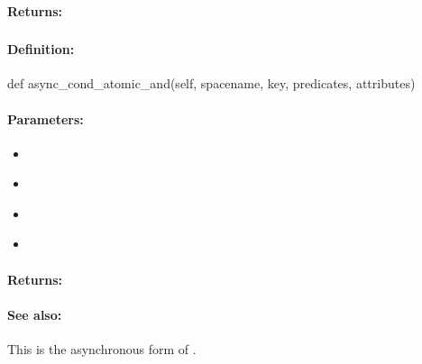 \paragraph{Returns:}


\pagebreak
\subsubsection{}
\label{api:python:async_cond_atomic_and}


\paragraph{Definition:}
\begin{pythoncode}
def async_cond_atomic_and(self, spacename, key, predicates, attributes)
\end{pythoncode}

\paragraph{Parameters:}
\begin{itemize}[noitemsep]
\item {}\\

\item {}\\

\item {}\\

\item {}\\

\end{itemize}

\paragraph{Returns:}


\paragraph{See also:}  This is the asynchronous form of .

